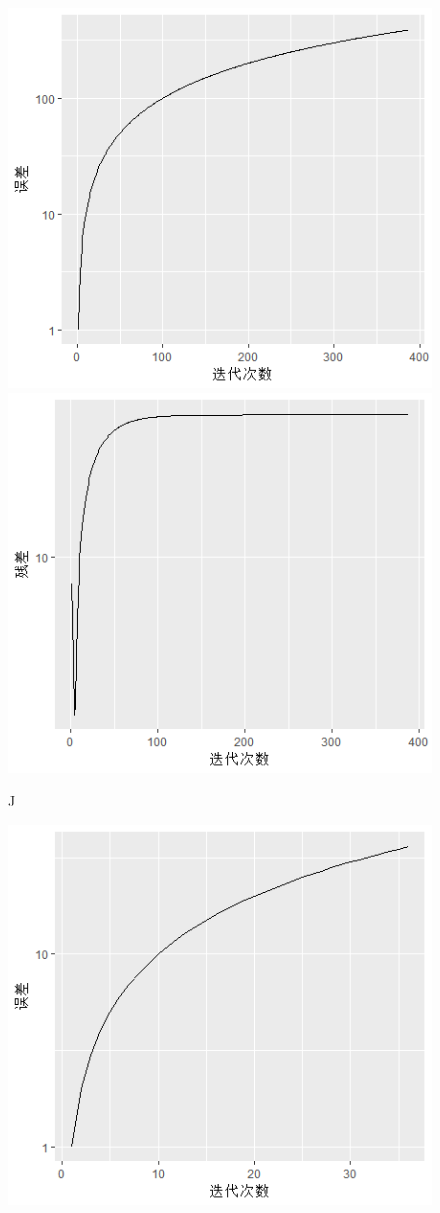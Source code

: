 \documentclass[10pt]{article}
\begin{document}
\begin{enumerate}
\begin{enumerate}
\begin{figure}[H]
  \includegraphics[width=.9\textwidth]{3-J1.png}
  \includegraphics[width=.9\textwidth]{3-J2.png}
  \caption{J}
  \end{figure}
\begin{figure}[H]
  \centering
  \includegraphics[width=.9\textwidth]{3-S1.png}

\end{figure}
\end{enumerate}
\end{enumerate}
\end{document}
